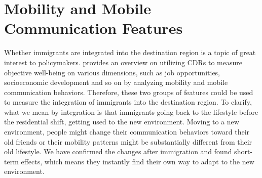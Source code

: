 \section{Mobility and Mobile Communication Features}
Whether immigrants are integrated into the destination region is a topic of great interest to policymakers. \cite{voukelatou2021measuring} provides an overview on utilizing CDRs to measure objective well-being on various dimensions, such as job opportunities, socioeconomic development and so on by analyzing mobility and mobile communication behaviors. Therefore, these two groups of features could be used to measure the integration of immigrants into the destination region. To clarify, what we mean by integration is that immigrants going back to the lifestyle before the residential shift, getting used to the new environment. Moving to a new environment, people might change their communication behaviors toward their old friends or their mobility patterns might be substantially different from their old lifestyle. We have confirmed the changes after immigration and found short-term effects, which means they instantly find their own way to adapt to the new environment.

